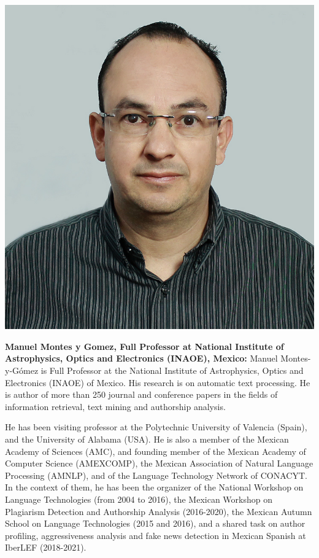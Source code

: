 \vspace{1em}
\begin{center}
\includegraphics[width=0.3\linewidth]{content/mexican_nlp/manuel.png}
\end{center}
{\bfseries Manuel Montes y Gomez, Full Professor at National Institute of Astrophysics, Optics and Electronics (INAOE), Mexico:}
Manuel Montes-y-G\'omez is Full Professor at the National Institute of Astrophysics, Optics and Electronics (INAOE) of Mexico. His research is on automatic text processing. He is author of more than 250 journal and conference papers in the fields of information retrieval, text mining and authorship analysis.

He has been visiting professor at the Polytechnic University of Valencia (Spain), and the University of Alabama (USA). He is also a member of the Mexican Academy of Sciences (AMC), and founding member of the Mexican Academy of Computer Science (AMEXCOMP), the Mexican Association of Natural Language Processing (AMNLP), and of the Language Technology Network of CONACYT. In the context of them, he has been the organizer of the National Workshop on Language Technologies (from 2004 to 2016), the Mexican Workshop on Plagiarism Detection and Authorship Analysis (2016-2020), the Mexican Autumn School on Language Technologies (2015 and 2016), and a shared task on author profiling, aggressiveness analysis and fake news detection in Mexican Spanish at IberLEF (2018-2021).

